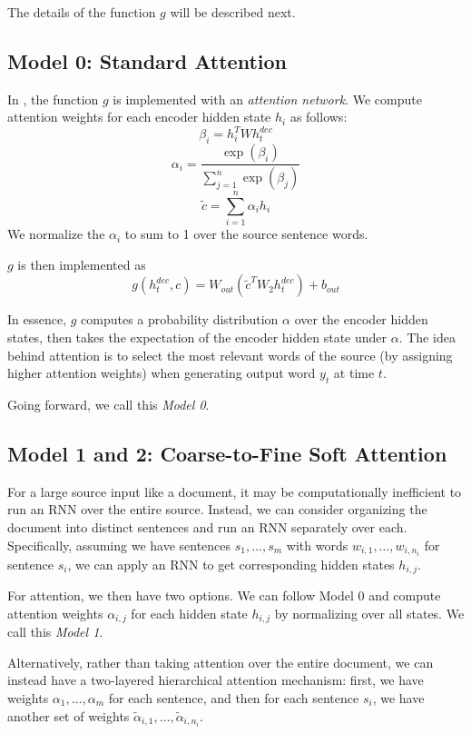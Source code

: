 \documentclass[11pt]{report}
\begin{document}
The details of the function $g$ will be described next.

\subsection{Model 0: Standard Attention}

In \cite{bahdanau2014neural}, the function $g$ is implemented with an \emph{attention network}. We compute attention weights for each encoder hidden state $h_i$ as follows:
$$\beta_i = h_i^T W h_t^{dec}$$
$$\alpha_i = \frac{\exp(\beta_i)}{\sum_{j=1}^n \exp(\beta_j)}$$
$$\widetilde{c} = \sum_{i=1}^n \alpha_i h_i$$
We normalize the $\alpha_i$ to sum to 1 over the source sentence words.

$g$ is then implemented as
$$g(h_t^{dec}, c) = W_{out}(\widetilde{c}^T W_2 h_t^{dec}) + b_{out}$$

In essence, $g$ computes a probability distribution $\alpha$ over the encoder hidden states, then takes the expectation of the encoder hidden state under $\alpha$. The idea behind attention is to select the most relevant words of the source (by assigning higher attention weights) when generating output word $y_t$ at time $t$.

Going forward, we call this \emph{Model 0}.

\subsection{Model 1 and 2: Coarse-to-Fine Soft Attention}

For a large source input like a document, it may be computationally inefficient to run an RNN over the entire source. Instead, we can consider organizing the document into distinct sentences and run an RNN separately over each. Specifically, assuming we have sentences $s_1, \ldots, s_m$ with words $w_{i,1}, \ldots, w_{i,n_i}$ for sentence $s_i$, we can apply an RNN to get corresponding hidden states $h_{i,j}$.

For attention, we then have two options. We can follow Model 0 and compute attention weights $\alpha_{i,j}$ for each hidden state $h_{i,j}$ by normalizing over all states. We call this \emph{Model 1}.

Alternatively, rather than taking attention over the entire document, we can instead have a two-layered hierarchical attention mechanism: first, we have weights $\alpha_1, \ldots, \alpha_m$ for each sentence, and then for each sentence $s_i$, we have another set of weights $\widetilde{\alpha}_{i,1}, \ldots, \widetilde{\alpha}_{i,n_i}$.
\end{document}
